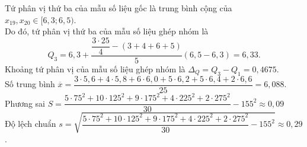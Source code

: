 \begin{ex}
{		Tứ phân vị thứ ba của mẫu số liệu gốc là trung bình cộng của $x_{19},x_{20} \in[6{,}3; 6{,}5)$.\\
		Do đó, tứ phân vị thứ ba của mẫu số liệu ghép nhóm là  $$Q_{3}=6{,}3+\dfrac{\dfrac{3\cdot25}{4}-(3+4+6+5)}{5}(6{,}5-6{,}3)=6{,}33.$$
		Khoảng tứ phân vị của mẫu số liệu ghép nhóm là  $\Delta_{Q}=Q_{3}-Q_{1}=0{,}4675$.\\
		Số trung bình $\overline{x}=\dfrac{3\cdot5{,}6+4\cdot5{,}8+6\cdot6{,}0+5\cdot6{,}2+5\cdot6{,}4+2\cdot6{,}6}{25}=6{,}088$.\\
		Phương sai 
		$S=\dfrac{5\cdot 75^{2}+10\cdot 125^{2}+9\cdot 175^{2}+4\cdot 225^{2}+2\cdot 275^{2}}{30}-155^{2} \approx 0{,}09$\\
		Độ lệch chuẩn $s=\sqrt{\dfrac{5\cdot 75^{2}+10\cdot 125^{2}+9\cdot 175^{2}+4\cdot 225^{2}+2\cdot 275^{2}}{30}-155^{2}} \approx 0{,}29$.
	}
\end{ex}

